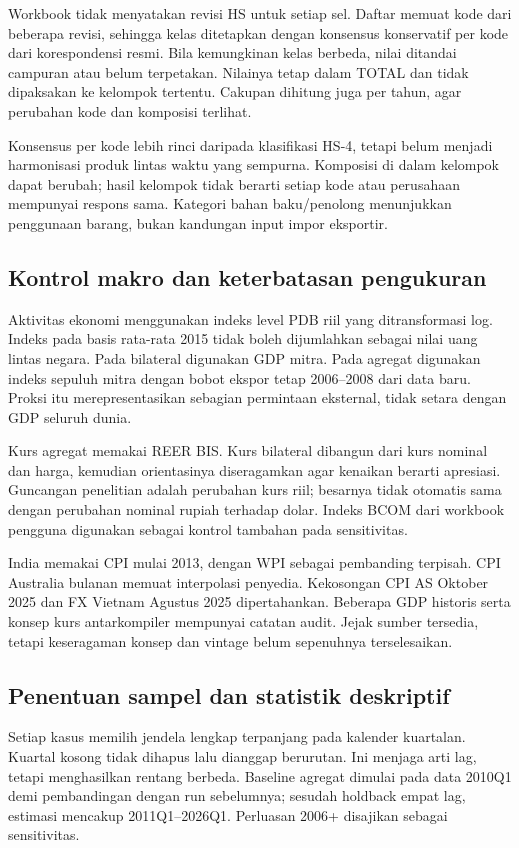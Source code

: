 Workbook tidak menyatakan revisi HS untuk setiap sel. Daftar memuat kode dari beberapa revisi, sehingga kelas ditetapkan dengan konsensus konservatif per kode dari korespondensi resmi. Bila kemungkinan kelas berbeda, nilai ditandai campuran atau belum terpetakan. Nilainya tetap dalam TOTAL dan tidak dipaksakan ke kelompok tertentu. Cakupan dihitung juga per tahun, agar perubahan kode dan komposisi terlihat.

Konsensus per kode lebih rinci daripada klasifikasi HS-4, tetapi belum menjadi harmonisasi produk lintas waktu yang sempurna. Komposisi di dalam kelompok dapat berubah; hasil kelompok tidak berarti setiap kode atau perusahaan mempunyai respons sama. Kategori bahan baku/penolong menunjukkan penggunaan barang, bukan kandungan input impor eksportir.

\subsection{Kontrol makro dan keterbatasan pengukuran}
Aktivitas ekonomi menggunakan indeks level PDB riil yang ditransformasi log. Indeks pada basis rata-rata 2015 tidak boleh dijumlahkan sebagai nilai uang lintas negara. Pada bilateral digunakan GDP mitra. Pada agregat digunakan indeks sepuluh mitra dengan bobot ekspor tetap 2006--2008 dari data baru. Proksi itu merepresentasikan sebagian permintaan eksternal, tidak setara dengan GDP seluruh dunia.

Kurs agregat memakai REER BIS. Kurs bilateral dibangun dari kurs nominal dan harga, kemudian orientasinya diseragamkan agar kenaikan berarti apresiasi. Guncangan penelitian adalah perubahan kurs riil; besarnya tidak otomatis sama dengan perubahan nominal rupiah terhadap dolar. Indeks BCOM dari workbook pengguna digunakan sebagai kontrol tambahan pada sensitivitas.

India memakai CPI mulai 2013, dengan WPI sebagai pembanding terpisah. CPI Australia bulanan memuat interpolasi penyedia. Kekosongan CPI AS Oktober 2025 dan FX Vietnam Agustus 2025 dipertahankan. Beberapa GDP historis serta konsep kurs antarkompiler mempunyai catatan audit. Jejak sumber tersedia, tetapi keseragaman konsep dan vintage belum sepenuhnya terselesaikan.

\subsection{Penentuan sampel dan statistik deskriptif}
Setiap kasus memilih jendela lengkap terpanjang pada kalender kuartalan. Kuartal kosong tidak dihapus lalu dianggap berurutan. Ini menjaga arti lag, tetapi menghasilkan rentang berbeda. Baseline agregat dimulai pada data 2010Q1 demi pembandingan dengan run sebelumnya; sesudah holdback empat lag, estimasi mencakup 2011Q1--2026Q1. Perluasan 2006+ disajikan sebagai sensitivitas.

